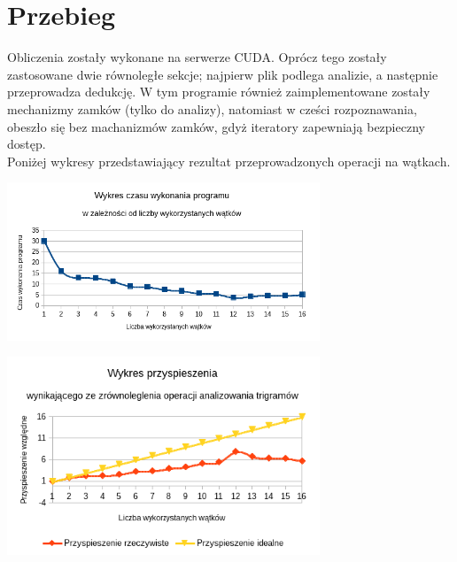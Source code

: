 \documentclass[a4paper,12pt]{article}
\begin{document}
\section*{Przebieg}
Obliczenia zostały wykonane na serwerze CUDA. Oprócz tego zostały zastosowane dwie równoległe sekcje; najpierw plik podlega analizie, a następnie przeprowadza dedukcję. W tym programie również zaimplementowane zostały mechanizmy zamków (tylko do analizy), natomiast w cześci rozpoznawania, obeszło się bez machanizmów zamków, gdyż iteratory zapewniają bezpieczny dostęp.\\



Poniżej wykresy przedstawiający rezultat przeprowadzonych operacji na wątkach.
\\
\begin{center}
\includegraphics[width=0.7\textwidth]{data/wykonanie.png}
\end{center}


\begin{center}
\includegraphics[width=0.7\textwidth]{data/przyspieszenie.png}
\end{center}
\end{document}

